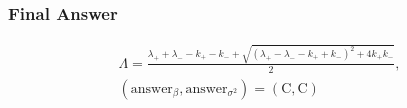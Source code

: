 \subsubsection*{Final Answer}

\[
\boxed{
\begin{gathered}
\Lambda=\frac{\lambda_++\lambda_- -k_+-k_-+
\sqrt{(\lambda_+-\lambda_- -k_+ +k_-)^2+4k_+k_-}}{2},\\
(\mathrm{answer}_{\beta},\mathrm{answer}_{\sigma^2})=(\mathrm{C},\mathrm{C})
\end{gathered}
}
\]
